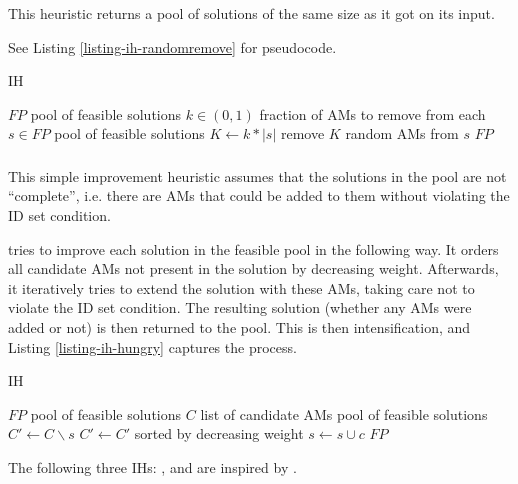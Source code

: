 This heuristic returns a pool of solutions of the same size as it got on its input.

See Listing \ref{listing-ih-randomremove} for pseudocode.

\begin{algorithm}
\caption{ IH}
\label{listing-ih-randomremove}
\begin{algorithmic}
\REQUIRE $FP$ pool of feasible solutions
\REQUIRE $k \in (0,1)$ fraction of AMs to remove from each $s \in FP$
\ENSURE pool of feasible solutions
  \STATE $K \gets k * |s|$
  \STATE remove $K$ random AMs from $s$
\ENDFOR
\RETURN $FP$
\end{algorithmic}
\end{algorithm}

\subsubsection{}

This simple improvement heuristic assumes that the solutions in the pool are not ``complete'', i.e. there are AMs that could be added to them without violating the ID set condition.

 tries to improve each solution in the feasible pool in the following way. It orders all candidate AMs not present in the solution by decreasing weight. Afterwards, it iteratively tries to extend the solution with these AMs, taking care not to violate the ID set condition. The resulting solution (whether any AMs were added or not) is then returned to the pool. This is then intensification, and Listing \ref{listing-ih-hungry} captures the process.\\

\begin{algorithm}
\caption{ IH}
\label{listing-ih-hungry}
\begin{algorithmic}
\REQUIRE $FP$ pool of feasible solutions
\REQUIRE $C$ list of candidate AMs
\ENSURE pool of feasible solutions
  \STATE {}
  \STATE $C' \gets C \backslash s$
  \STATE $C' \gets C'$ sorted by decreasing weight
      \STATE $s \gets s \cup c$
    \ENDIF
  \ENDFOR
\ENDFOR
\RETURN $FP$
\end{algorithmic}
\end{algorithm}

The following three IHs: ,  and  are inspired by \cite{heu-lecture}.

